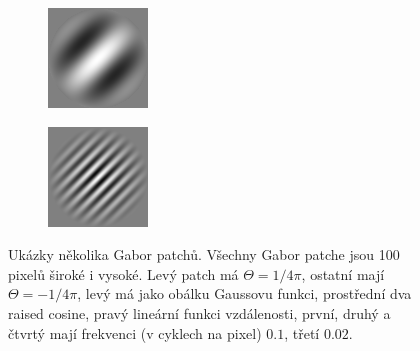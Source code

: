 \begin{figure}[h!]
\begin{subfigure}{0.25\textwidth}
  \includegraphics[width=.8\linewidth]{img/gabor3}
\end{subfigure}%
\begin{subfigure}{0.25\textwidth}
  \centering
  \includegraphics[width=.8\linewidth]{img/gabor4}
\end{subfigure}%

\caption{Ukázky několika Gabor patchů. Všechny Gabor patche jsou 100 pixelů
široké i vysoké. Levý patch má $\Theta = 1/4\pi$, ostatní mají $\Theta =
-1/4\pi$, levý má jako obálku Gaussovu funkci, prostřední dva raised cosine,
pravý lineární funkci vzdálenosti, první, druhý a čtvrtý mají frekvenci (v
cyklech na pixel) $0.1$, třetí $0.02$.} 

\label{obr:gabor:example} 
 
\end{figure}

